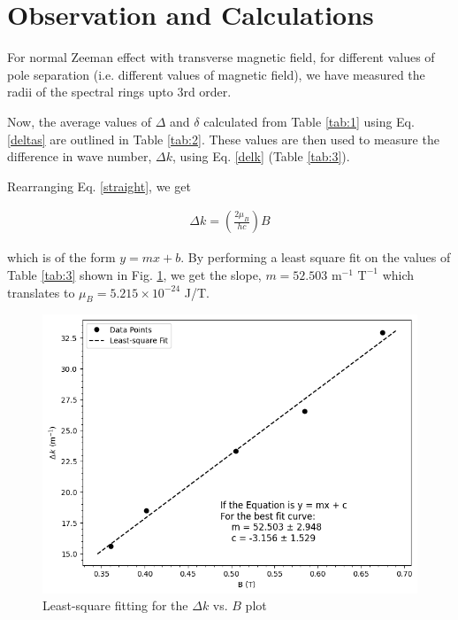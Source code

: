 \section{Observation and Calculations}

For normal Zeeman effect with transverse magnetic field, for different values of pole separation (i.e. different values of magnetic field), we have measured the radii of the spectral rings upto 3rd order.


Now, the average values of $\Delta$ and $\delta$ calculated from Table \ref{tab:1} using Eq. \ref{deltas} are outlined in Table \ref{tab:2}. These values are then used to measure the difference in wave number, $\Delta k$, using Eq. \ref{delk} (Table \ref{tab:3}).




Rearranging Eq. \ref{straight}, we get 

\begin{align} \label{slope}
    \Delta k = \left(\frac{2\mu_B}{hc}\right)B
\end{align}

which is of the form $y=mx+b$. By performing a least square fit on the values of Table \ref{tab:3} shown in Fig. \ref{plot}, we get the slope, $m=52.503 \text{ m}^{-1} \text{ T}^{-1}$ which translates to $\mu_B=5.215 \times 10^{-24}$ J/T.

\begin{figure}
    \centering
    \includegraphics[width=1\columnwidth]{images/plot.png}
    \caption{Least-square fitting for the $\Delta k$ vs. $B$ plot}
    \label{plot}
\end{figure}

